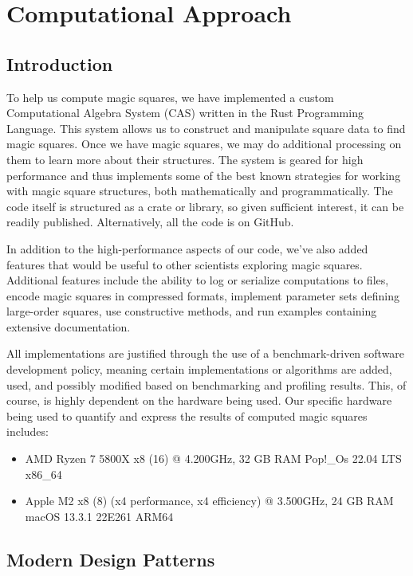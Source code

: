\documentclass{rhumj_new}
\begin{document}
\section{Computational Approach}

\subsection{Introduction}

To help us compute magic squares, we have implemented a custom Computational Algebra System (CAS)
written in the Rust Programming Language. This system allows us to construct and manipulate square
data to find magic squares. Once we have magic squares, we may do additional processing on them to
learn more about their structures. The system is geared for high performance and thus implements
some of the best known strategies for working with magic square structures, both mathematically and
programmatically. The code itself is structured as a crate or library, so given sufficient
interest, it can be readily published. Alternatively, all the code is on GitHub\cite{Keough}.

In addition to the high-performance aspects of our code, we've also added features that would be
useful to other scientists exploring magic squares. Additional features include the ability to log
or serialize computations to files, encode magic squares in compressed formats, implement parameter
sets defining large-order squares, use constructive methods, and run examples containing extensive
documentation.

All implementations are justified through the use of a benchmark-driven software development
policy, meaning certain implementations or algorithms are added, used, and possibly modified based
on benchmarking and profiling results. This, of course, is highly dependent on the hardware being
used. Our specific hardware being used to quantify and express the results of computed magic
squares includes:

\begin{itemize}
  \item AMD Ryzen 7 5800X x8 (16) @ 4.200GHz, 32 GB RAM \textemdash{}  Pop!\_Os 22.04 LTS x86\_64
  \item Apple M2 x8 (8) (x4 performance, x4 efficiency) @ 3.500GHz, 24 GB RAM \textemdash{} macOS
        13.3.1
        22E261 ARM64
\end{itemize}

\subsection{Modern Design Patterns}
\end{document}
